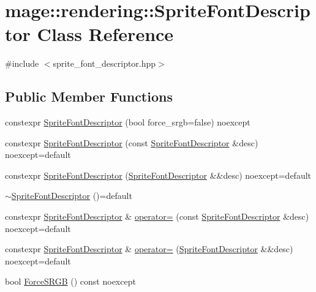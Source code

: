 \hypertarget{classmage_1_1rendering_1_1_sprite_font_descriptor}{}\section{mage\+:\+:rendering\+:\+:Sprite\+Font\+Descriptor Class Reference}
\label{classmage_1_1rendering_1_1_sprite_font_descriptor}


{\ttfamily \#include $<$sprite\+\_\+font\+\_\+descriptor.\+hpp$>$}

\subsection*{Public Member Functions}
\begin{DoxyCompactItemize}
\item 
constexpr \hyperlink{classmage_1_1rendering_1_1_sprite_font_descriptor_a82c66afe6cc815ad223c15642cd2ac00}{Sprite\+Font\+Descriptor} (bool force\+\_\+srgb=false) noexcept
\item 
constexpr \hyperlink{classmage_1_1rendering_1_1_sprite_font_descriptor_a168e12be8a7029e5f5dcffe058100bd6}{Sprite\+Font\+Descriptor} (const \hyperlink{classmage_1_1rendering_1_1_sprite_font_descriptor}{Sprite\+Font\+Descriptor} \&desc) noexcept=default
\item 
constexpr \hyperlink{classmage_1_1rendering_1_1_sprite_font_descriptor_a1a84c848b090000d444fdade6ca171e2}{Sprite\+Font\+Descriptor} (\hyperlink{classmage_1_1rendering_1_1_sprite_font_descriptor}{Sprite\+Font\+Descriptor} \&\&desc) noexcept=default
\item 
\hyperlink{classmage_1_1rendering_1_1_sprite_font_descriptor_adef19c1e38ed5a685578a855b17c08bc}{$\sim$\+Sprite\+Font\+Descriptor} ()=default
\item 
constexpr \hyperlink{classmage_1_1rendering_1_1_sprite_font_descriptor}{Sprite\+Font\+Descriptor} \& \hyperlink{classmage_1_1rendering_1_1_sprite_font_descriptor_a41d694f929b38995aca3ccb7ee79215e}{operator=} (const \hyperlink{classmage_1_1rendering_1_1_sprite_font_descriptor}{Sprite\+Font\+Descriptor} \&desc) noexcept=default
\item 
constexpr \hyperlink{classmage_1_1rendering_1_1_sprite_font_descriptor}{Sprite\+Font\+Descriptor} \& \hyperlink{classmage_1_1rendering_1_1_sprite_font_descriptor_a40479c5c747c6cbcb5fdf09e6027d650}{operator=} (\hyperlink{classmage_1_1rendering_1_1_sprite_font_descriptor}{Sprite\+Font\+Descriptor} \&\&desc) noexcept=default
\item 
bool \hyperlink{classmage_1_1rendering_1_1_sprite_font_descriptor_a4d7ab52dc3380f1c88b847248825438d}{Force\+S\+R\+GB} () const noexcept
\end{DoxyCompactItemize}
